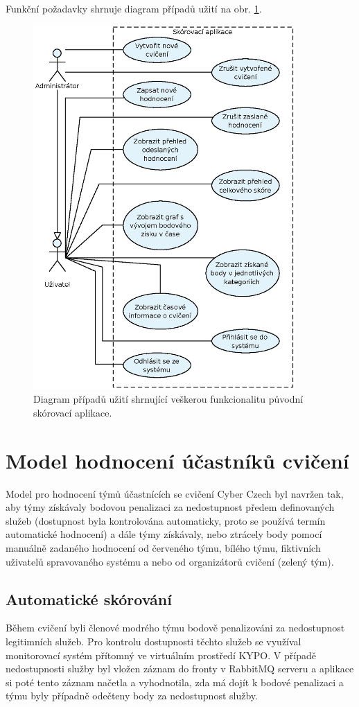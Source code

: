 \documentclass[
  digital, %
  twoside, %
  table,   %
  lof,     %
  lot,     %
]{fithesis3}
\begin{document}
Funkční požadavky shrnuje diagram případů užití na obr. \ref{fig:useCase1}.

\begin{figure}[h!]
    \centering
    \includegraphics[width=10cm]{images/Use-case-1.eps}
    \caption{Diagram případů užití shrnující veškerou funkcionalitu původní skórovací aplikace.}
    \label{fig:useCase1}
\end{figure}

\section{Model hodnocení účastníků cvičení}
Model pro hodnocení týmů účastnících se cvičení Cyber Czech byl navržen tak, aby týmy získávaly bodovou penalizaci za nedostupnost předem definovaných služeb (dostupnost byla kontrolována automaticky, proto se používá termín automatické hodnocení) a dále týmy získávaly, nebo ztrácely body pomocí manuálně zadaného hodnocení od červeného týmu, bílého týmu, fiktivních uživatelů spravovaného systému a nebo od organizátorů cvičení (zelený tým).

\subsection{Automatické skórování}
Během cvičení byli členové modrého týmu bodově penalizováni za nedostupnost legitimních služeb. Pro kontrolu dostupnosti těchto služeb se využíval monitorovací systém přítomný ve virtuálním prostředí KYPO. V případě nedostupnosti služby byl vložen záznam do fronty v RabbitMQ serveru a aplikace si poté tento záznam načetla a vyhodnotila, zda má dojít k bodové penalizaci a týmu byly případně odečteny body za nedostupnost služby.
\end{document}
